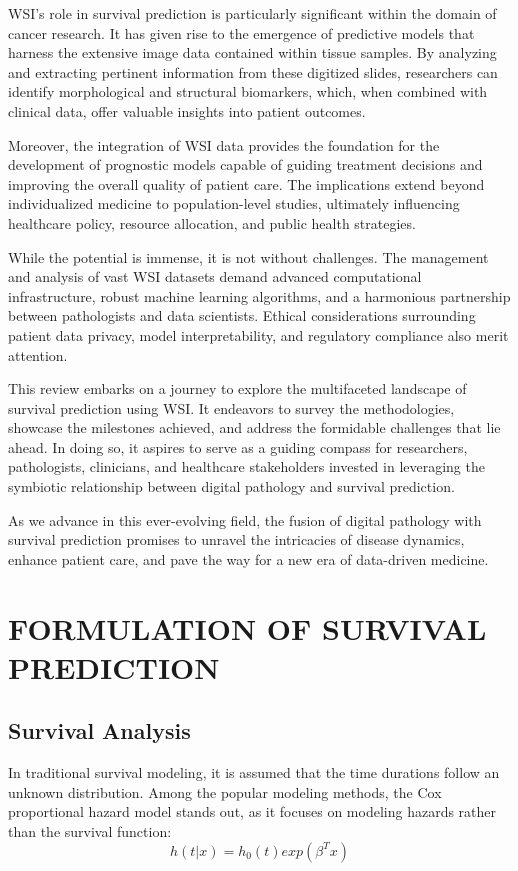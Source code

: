 \documentclass[journal,twoside,web]{ieeecolor}
\begin{document}
WSI's role in survival prediction is particularly significant within the domain of cancer research. It has given rise to the emergence of predictive models that harness the extensive image data contained within tissue samples. By analyzing and extracting pertinent information from these digitized slides, researchers can identify morphological and structural biomarkers, which, when combined with clinical data, offer valuable insights into patient outcomes.

Moreover, the integration of WSI data provides the foundation for the development of prognostic models capable of guiding treatment decisions and improving the overall quality of patient care. The implications extend beyond individualized medicine to population-level studies, ultimately influencing healthcare policy, resource allocation, and public health strategies.

While the potential is immense, it is not without challenges. The management and analysis of vast WSI datasets demand advanced computational infrastructure, robust machine learning algorithms, and a harmonious partnership between pathologists and data scientists. Ethical considerations surrounding patient data privacy, model interpretability, and regulatory compliance also merit attention.

This review embarks on a journey to explore the multifaceted landscape of survival prediction using WSI. It endeavors to survey the methodologies, showcase the milestones achieved, and address the formidable challenges that lie ahead. In doing so, it aspires to serve as a guiding compass for researchers, pathologists, clinicians, and healthcare stakeholders invested in leveraging the symbiotic relationship between digital pathology and survival prediction.

As we advance in this ever-evolving field, the fusion of digital pathology with survival prediction promises to unravel the intricacies of disease dynamics, enhance patient care, and pave the way for a new era of data-driven medicine.

\section{FORMULATION OF SURVIVAL PREDICTION}
\subsection{Survival Analysis}
In traditional survival modeling, it is assumed that the time durations follow an unknown distribution. Among the popular modeling methods, the Cox proportional hazard model stands out, as it focuses on modeling hazards rather than the survival function:
\begin{equation}\label{traditional}
h(t|x)=h_0(t)exp(\beta^Tx)
\end{equation}
\end{document}
